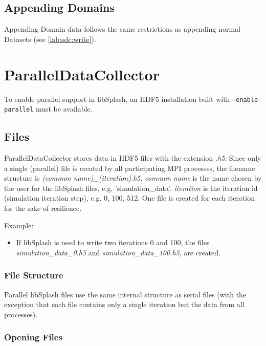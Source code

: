 \documentclass[a4paper,10pt,BCOR12mm]{report}
\newcommand{\code}[1]{\small \texttt{#1}}
\begin{document}
\section{Appending Domains}

Appending Domain data follows the same restrictions as appending normal Datasets (see \ref{lab:sdc:write}).



\chapter{ParallelDataCollector}

To enable parallel support in libSplash, an HDF5 installation built with \code{--enable-parallel}
must be available.


\section{Files}

ParallelDataCollector stores data in HDF5 files with the extension \emph{.h5}.
Since only a single (parallel) file is created by all participating MPI processes,
the filename structure is \emph{(common name)\_(iteration).h5}.
\emph{common name} is the name chosen by the user for the libSplash files, e.g.
'simulation\_data'.
\emph{iteration} is the iteration id (simulation iteration step), e.g. 0, 100, 512.
One file is created for each iteration for the sake of resilience.

Example:
\begin{itemize}
	\item If libSplash is used to write two iterations 0 and 100, the files
	\emph{simulation\_data\_0.h5} and \emph{simulation\_data\_100.h5}, are created.
\end{itemize}


\subsection{File Structure}

Parallel libSplash files use the same internal structure as serial files (with the exception
that each file contains only a single iteration but the data from all processes).


\subsection{Opening Files}
\end{document}
